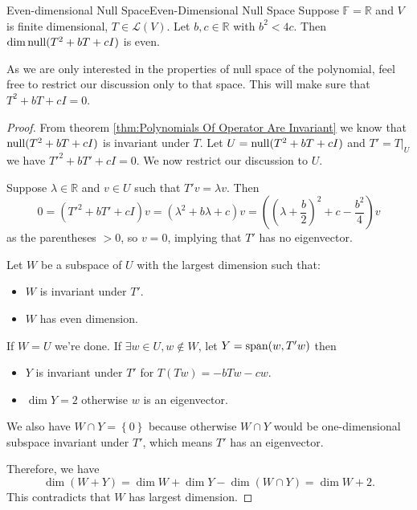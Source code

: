 \documentclass[../main.tex]{subfiles}
\begin{document}
\begin{lemma}{Even-dimensional Null Space}{Even-Dimensional Null Space}
Suppose $\mathbb{F}=\mathbb{R}$ and $V$ is finite dimensional, $T\in \mathscr{L}(V)$. Let $b,c\in \mathbb{R}$ with $b ^2<4c$. Then $\dim \operatorname{null} (T^2+bT+cI)$ is even.
\end{lemma}
As we are only interested in the properties of null space of the polynomial, feel free to restrict our discussion only to that space. This will make sure that $T^2+bT+cI = 0$.
\begin{proof}
	From theorem \ref{thm:Polynomials Of Operator Are Invariant} we know that $\operatorname{null} (T^2+bT+cI)$ is invariant under $T$. Let $U = \operatorname{null} (T^2+bT+cI)$ and $T' = T|_U$ we have $T'^2+bT'+cI = 0$. We now restrict our discussion to $U$.

	Suppose $\lambda\in \mathbb{R}$ and $v\in U$ such that $T'v = \lambda v$. Then
	\begin{equation*}
	0 = (T'^2+bT'+cI)v = (\lambda^2+b \lambda+c)v = \left(\left(\lambda + \frac{b}{2}\right)^2 + c - \frac{b^2}{4}\right)v
	\end{equation*}
as the parentheses $>0$, so $v=0$, implying that $T'$ has no eigenvector.

Let $W$ be a subspace of $U$ with the largest dimension such that:
\begin{itemize}
\item $W$ is invariant under $T'$.
\item $W$ has even dimension.
\end{itemize}
If $W=U$ we're done. If $\exists w\in U,w\notin W$, let $Y = \operatorname{span}(w,T'w)$ then 
\begin{itemize}
\item $Y$ is invariant under $T'$ for $T(Tw) = -b Tw-cw$.
\item $\dim Y=2$ otherwise $w$ is an eigenvector.
\end{itemize}
We also have  $W\cap Y = \left\{ 0 \right\} $ because otherwise $W\cap Y$ would be one-dimensional subspace invariant under $T'$, which means $T'$ has an eigenvector.

Therefore, we have
\begin{equation*}
\dim (W+Y) = \dim W+\dim Y - \dim (W\cap Y) = \dim W + 2.
\end{equation*}
This contradicts that $W$ has largest dimension.
\end{proof}
\end{document}
